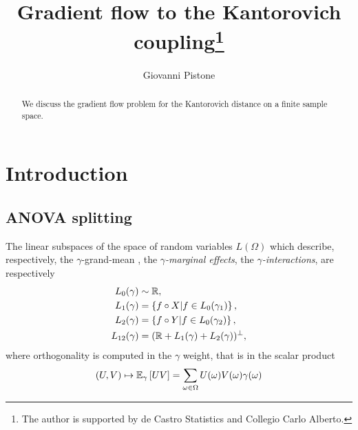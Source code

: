 \documentclass[runningheads]{llncs}
\begin{document}
%
\title{Gradient flow to the Kantorovich coupling\thanks{The author is
    supported by de Castro Statistics and Collegio Carlo Alberto.}}
%
%
\author{Giovanni Pistone}
%
%
%
\maketitle              %
%
\begin{abstract}
We discuss the gradient flow problem for the Kantorovich distance on a
finite sample space.

\end{abstract}
%
%
%
\section{Introduction}

\subsection{ANOVA splitting}
%
The linear subspaces of the space of random variables $L(\Omega)$ which describe, respectively, the $\gamma$-grand-mean , the \emph{$\gamma$-marginal effects}, the \emph{$\gamma$-interactions}, are respectively
%
\begin{equation}\label{eq:ANOVA-spaces}
\begin{aligned}
  L_0(\gamma) &\sim \mathbb R, \\
  L_1(\gamma) &= \left\{ f\circ X \middle| f \in L_0(\gamma_1) \right\},\\
  L_2(\gamma) &= \left\{ f\circ Y \middle| f \in L_0(\gamma_2) \right\},\\
  L_{12}(\gamma) &= (\mathbb R + L_1(\gamma) + L_2(\gamma))^\perp,
\end{aligned}
\end{equation}
%
where orthogonality is computed in the $\gamma$ weight, that is in the scalar product
%
\begin{equation*}
(U,V) \mapsto {\operatorname{\mathbb E}}_{\gamma}\left[UV\right] = \sum_{\omega\in\Omega}U(\omega)V(\omega)
\gamma(\omega)\end{equation*}
\end{document}
